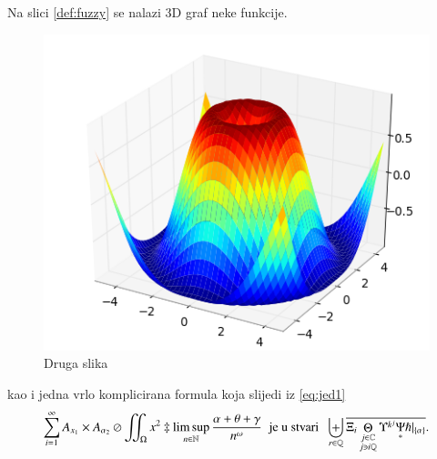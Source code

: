 \documentclass[a4paper,twoside,12pt]{memoir} %
\begin{document}
\begin{cv}
Na slici \ref{def:fuzzy} se nalazi 3D graf neke funkcije. 

\begin{figure}[h!t]
\centering \includegraphics{surface3d.png}
\caption{Druga slika}
\label{fig:3d}
\end{figure}

kao i jedna vrlo komplicirana formula koja slijedi iz \eqref{eq:jed1}
\[ \sum_{i=1}^{\infty}A_{x_1}\times A_{{\alpha}_2}\oslash\iint_{\Omega}x^2\ddagger\limsup_{n\in\mathbb{N}}\frac{\alpha+\theta+\gamma}{n^{\omega}}\;\;\text{je u stvari}\;\;\biguplus_{r\in\mathbb{Q}}\overline{\Xi_i \mathop\Theta_{\substack{j\in\mathbb{C} \\ j\ni i\mathbb{Q}}} \Upsilon^{k^j} \underset{\ast}{\Psi} \hslash\vert_{\{\alpha\}}}.\]
\end{cv}
\end{document}
